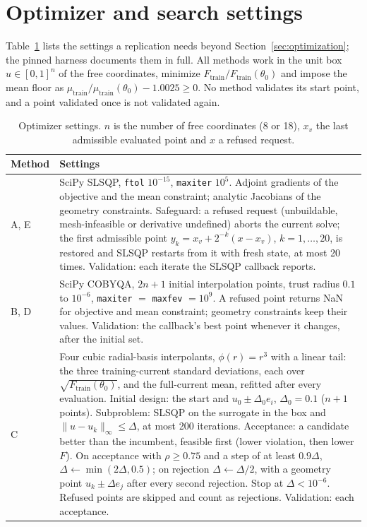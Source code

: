 \documentclass{anvil-paper}
\begin{document}
\section{Optimizer and search settings}\label{sec:settings}
Table~\ref{tab:settings} lists the settings a replication needs beyond
Section~\ref{sec:optimization}; the pinned harness documents them in full.
All methods work in the unit box $u\in[0,1]^n$ of the free coordinates,
minimize $F_{\mathrm{train}}/F_{\mathrm{train}}(\theta_0)$ and impose the
mean floor as $\mu_{\mathrm{train}}/\mu_{\mathrm{train}}(\theta_0)-1.0025\geq0$.
No method validates its start point, and a point validated once is not
validated again.

\begin{table}[H]\centering\small
\caption{Optimizer settings. $n$ is the number of free coordinates (8 or
18), $x_v$ the last admissible evaluated point and $x$ a refused request.}
\label{tab:settings}
\begin{tabular}{>{\raggedright\arraybackslash}p{.11\linewidth}>{\raggedright\arraybackslash}p{.83\linewidth}}\toprule
Method & Settings\\\midrule
A, E & SciPy SLSQP, \texttt{ftol} $10^{-15}$, \texttt{maxiter} $10^5$. Adjoint gradients of the objective and the mean constraint; analytic Jacobians of the geometry constraints. Safeguard: a refused request (unbuildable, mesh-infeasible or derivative undefined) aborts the current solve; the first admissible point $y_k=x_v+2^{-k}(x-x_v)$, $k=1,\ldots,20$, is restored and SLSQP restarts from it with fresh state, at most 20 times. Validation: each iterate the SLSQP callback reports.\\
B, D & SciPy COBYQA, $2n+1$ initial interpolation points, trust radius $0.1$ to $10^{-6}$, \texttt{maxiter} $=$ \texttt{maxfev} $=10^9$. A refused point returns NaN for objective and mean constraint; geometry constraints keep their values. Validation: the callback's best point whenever it changes, after the initial set.\\
C & Four cubic radial-basis interpolants, $\phi(r)=r^3$ with a linear tail: the three training-current standard deviations, each over $\sqrt{F_{\mathrm{train}}(\theta_0)}$, and the full-current mean, refitted after every evaluation. Initial design: the start and $u_0\pm\Delta_0e_i$, $\Delta_0=0.1$ ($n+1$ points). Subproblem: SLSQP on the surrogate in the box and $\|u-u_k\|_\infty\leq\Delta$, at most 200 iterations. Acceptance: a candidate better than the incumbent, feasible first (lower violation, then lower $F$). On acceptance with $\rho\geq0.75$ and a step of at least $0.9\Delta$, $\Delta\leftarrow\min(2\Delta,0.5)$; on rejection $\Delta\leftarrow\Delta/2$, with a geometry point $u_k\pm\Delta e_j$ after every second rejection. Stop at $\Delta<10^{-6}$. Refused points are skipped and count as rejections. Validation: each acceptance.\\
\bottomrule\end{tabular}
\end{table}
\end{document}
